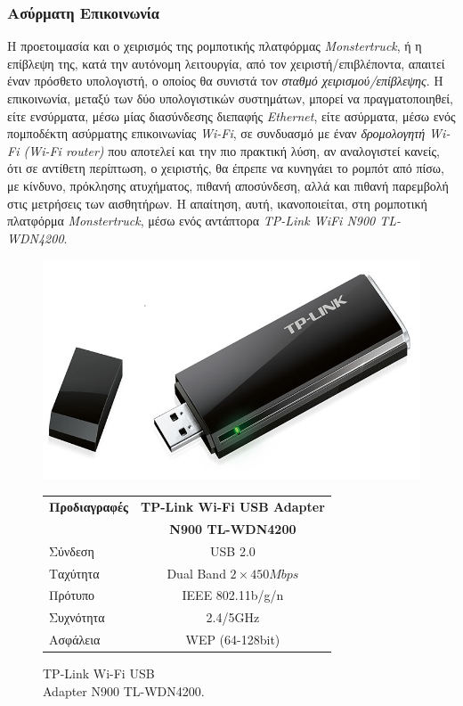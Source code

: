 \bigskip
\subsubsection{Ασύρματη Επικοινωνία} \label{sssec:wireless_communication}
Η προετοιμασία και ο χειρισμός της ρομποτικής πλατφόρμας \textit{Monstertruck}, ή η επίβλεψη της, κατά την αυτόνομη λειτουργία, από τον χειριστή/επιβλέποντα, απαιτεί έναν πρόσθετο υπολογιστή, ο οποίος θα συνιστά τον \textit{σταθμό χειρισμού/επίβλεψης}. Η επικοινωνία, μεταξύ των δύο υπολογιστικών συστημάτων, μπορεί να πραγματοποιηθεί, είτε ενσύρματα, μέσω μίας διασύνδεσης διεπαφής \textit{Ethernet}, είτε ασύρματα, μέσω ενός πομποδέκτη ασύρματης επικοινωνίας \textit{Wi-Fi}, σε συνδυασμό με έναν \textit{δρομολογητή Wi-Fi (Wi-Fi router)} που αποτελεί και την πιο πρακτική λύση, αν αναλογιστεί κανείς, ότι σε αντίθετη περίπτωση, ο χειριστής, θα έπρεπε να κυνηγάει το ρομπότ από πίσω, με κίνδυνο, πρόκλησης ατυχήματος, πιθανή αποσύνδεση, αλλά και πιθανή παρεμβολή στις μετρήσεις των αισθητήρων. H απαίτηση, αυτή, ικανοποιείται, στη ρομποτική πλατφόρμα \textit{Monstertruck}, μέσω ενός αντάπτορα \textit{TP-Link WiFi N900 TL-WDN4200}.

\bigskip
\begin{figure}[!ht]
	\begin{minipage}[b]{0.4\textwidth}
		\centering
		\includegraphics[width=0.6\linewidth]{Chapters/Chapter2/Figures/wifi_adapter.png}
		\caption{TP-Link Wi-Fi USB\\ Adapter N900 TL-WDN4200.}
		\label{fig:wifi_adapter}
	\end{minipage}		
	\begin{minipage}[b]{0.5\textwidth}
		\centering
		\begin{tabular}{| l | c |}
			\hline
			\textbf{Προδιαγραφές} & \textbf{TP-Link Wi-Fi USB Adapter}\\
			 &  \textbf{N900 TL-WDN4200}\\ \hline
			Σύνδεση & USB 2.0 \\ \hline
			Ταχύτητα & Dual Band $2 \times 450Mbps$\\ \hline
			Πρότυπο & IEEE 802.11b/g/n\\ \hline
			Συχνότητα & 2.4/5GHz\\ \hline
			Ασφάλεια & WEP (64-128bit)\\ \hline
		\end{tabular}
		\label{tab:wifi_adapter_specs}
	\end{minipage}
\end{figure}


